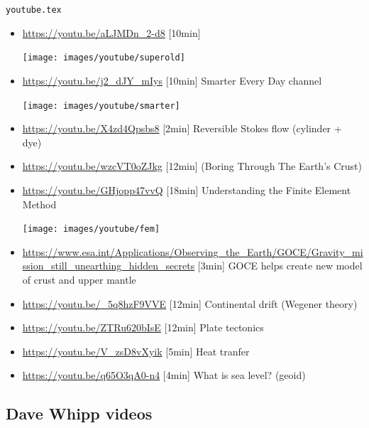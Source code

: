 \begin{flushright} {\tiny {\color{gray} \tt youtube.tex}} \end{flushright}

\begin{itemize}
\item \url{https://youtu.be/aLJMDn_2-d8} [10min]
\begin{center}
\texttt{[image: images/youtube/superold]}\\
\end{center}

\item \url{https://youtu.be/j2_dJY_mIys} [10min] Smarter Every Day channel
\begin{center}
\texttt{[image: images/youtube/smarter]}\\
\end{center}

\item \url{https://youtu.be/X4zd4Qpsbs8} [2min] Reversible Stokes flow (cylinder + dye)
\item \url{https://youtu.be/wzcVT0oZJkg} [12min] (Boring Through The Earth's Crust)
\item \url{https://youtu.be/GHjopp47vvQ} [18min] Understanding the Finite Element Method
\begin{center}
\texttt{[image: images/youtube/fem]}\\
\end{center}

\item \url{https://www.esa.int/Applications/Observing_the_Earth/GOCE/Gravity_mission_still_unearthing_hidden_secrets} [3min] GOCE helps create new model of crust and upper mantle
\item \url{https://youtu.be/_5q8hzF9VVE} [12min] Continental drift (Wegener theory) 
\item \url{https://youtu.be/ZTRu620bIsE} [12min] Plate tectonics
\item \url{https://youtu.be/V_zsD8vXyik} [5min] Heat tranfer 
\item \url{https://youtu.be/q65O3qA0-n4} [4min] What is sea level? (geoid) 

\end{itemize}

\subsection{Dave Whipp videos}

